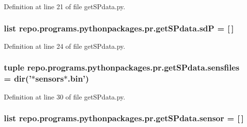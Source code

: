 Definition at line 21 of file get\-S\-Pdata.\-py.

\hypertarget{namespacerepo_1_1programs_1_1pythonpackages_1_1pr_1_1getSPdata_a1dcdb0bd4cf5fc99ddd642fd2e7dcb7b}{
\subsubsection[{sd\-P}]{\setlength{\rightskip}{0pt plus 5cm}list repo.\-programs.\-pythonpackages.\-pr.\-get\-S\-Pdata.\-sd\-P = \mbox{[}$\,$\mbox{]}}}\label{namespacerepo_1_1programs_1_1pythonpackages_1_1pr_1_1getSPdata_a1dcdb0bd4cf5fc99ddd642fd2e7dcb7b}


Definition at line 24 of file get\-S\-Pdata.\-py.

\hypertarget{namespacerepo_1_1programs_1_1pythonpackages_1_1pr_1_1getSPdata_ad0b93fd48f5d39d35267e0463a7d2e52}{
\subsubsection[{sensfiles}]{\setlength{\rightskip}{0pt plus 5cm}tuple repo.\-programs.\-pythonpackages.\-pr.\-get\-S\-Pdata.\-sensfiles = dir('$\ast$sensors$\ast$.bin')}}\label{namespacerepo_1_1programs_1_1pythonpackages_1_1pr_1_1getSPdata_ad0b93fd48f5d39d35267e0463a7d2e52}


Definition at line 30 of file get\-S\-Pdata.\-py.

\hypertarget{namespacerepo_1_1programs_1_1pythonpackages_1_1pr_1_1getSPdata_a5d2dee28b4f96a6448beb4b18e01fb24}{
\subsubsection[{sensor}]{\setlength{\rightskip}{0pt plus 5cm}list repo.\-programs.\-pythonpackages.\-pr.\-get\-S\-Pdata.\-sensor = \mbox{[}$\,$\mbox{]}}}\label{namespacerepo_1_1programs_1_1pythonpackages_1_1pr_1_1getSPdata_a5d2dee28b4f96a6448beb4b18e01fb24}


